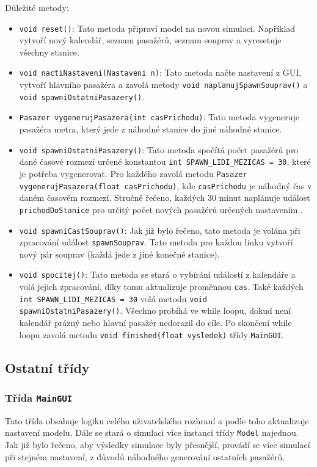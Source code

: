 \documentclass[12pt, a4paper]{article}
\begin{document}
Důležité metody:
\begin{itemize}
    \item \texttt{void reset()}: Tato metoda připraví model na novou simulaci. Například vytvoří nový kalendář, seznam pasažérů, seznam souprav a vyresetuje všechny stanice.
    \item \texttt{void nactiNastaveni(Nastaveni n)}: Tato metoda načte nastavení z GUI, vytvoří hlavního pasažéra a zavolá metody \texttt{void naplanujSpawnSouprav()} a \texttt{void spawniOstatniPasazery()}.
    \item \texttt{Pasazer vygenerujPasazera(int casPrichodu)}: Tato metoda vygeneruje pasažéra metra, který jede z náhodné stanice do jiné náhodné stanice.
    \item \texttt{void spawniOstatniPasazery()}: Tato metoda spočítá počet pasažérů pro dané časové rozmezí určené konstantou \texttt{int SPAWN\_LIDI\_MEZICAS = 30}, které je potřeba vygenerovat. Pro každého zavolá metodu \texttt{Pasazer vygenerujPasazera(float casPrichodu)}, kde \texttt{casPrichodu} je náhodný čas v daném časovém rozmezí. Stručně řečeno, každých 30 minut naplánuje událost \texttt{prichodDoStanice} pro určitý počet nových pasažérů určených nastavením .
    \item \texttt{void spawniCastSouprav()}: Jak již bylo řečeno, tato metoda je volána při zpracování událost \texttt{spawnSouprav}. Tato metoda pro každou linku vytvoří nový pár souprav (každá jede z jiné konečné stanice).
    \item \texttt{void spocitej()}: Tato metoda se stará o vybírání událostí z kalendáře a volá jejich zpracování, díky tomu aktualizuje proměnnou \texttt{cas}. Také každých \texttt{int SPAWN\_LIDI\_MEZICAS = 30} volá metodu \texttt{void spawniOstatniPasazery()}. Všechno probíhá ve while loopu, dokud není kalendář prázný nebo hlavní pasažér nedorazil do cíle. Po skončení while loopu zavolá metodu \texttt{void finished(float vysledek)} třídy \texttt{MainGUI}.
\end{itemize}

\subsection{Ostatní třídy}
\subsubsection{Třída \texttt{MainGUI}}
Tato třída obsahuje logiku celého uživatelského rozhraní a podle toho aktualizuje nastavení modelu. Dále se stará o simulaci více instancí třídy \texttt{Model} najednou. Jak již bylo řečeno, aby výsledky simulace byly přesnější, provádí se více simulací při stejném nastavení, z důvodů náhodného generování ostatních pasažérů.
\end{document}
